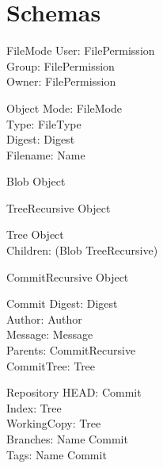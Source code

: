 \section{Schemas}

\begin{schema}{FileMode}
  User: FilePermission \\
  Group: FilePermission \\
  Owner: FilePermission
\end{schema}

\begin{schema}{Object}
  Mode: FileMode \\
  Type: FileType \\
	Digest: Digest \\
	Filename: Name
\end{schema}

\begin{schema}{Blob}
	Object
\end{schema}

\begin{schema}{TreeRecursive}
	Object
\end{schema}

\begin{schema}{Tree}
	Object \\
	Children: \power (Blob \cup TreeRecursive)
\end{schema}

\begin{schema}{CommitRecursive}
	Object
\end{schema}

\begin{schema}{Commit}
	Digest: Digest \\
	Author: Author \\
	Message: Message \\
	Parents: \power CommitRecursive \\
	CommitTree: Tree
\end{schema}

\begin{schema}{Repository}
	HEAD: Commit \\
	Index: Tree \\
	WorkingCopy: Tree \\
	Branches: Name \pfun Commit \\
	Tags: Name \pfun Commit
\end{schema}

